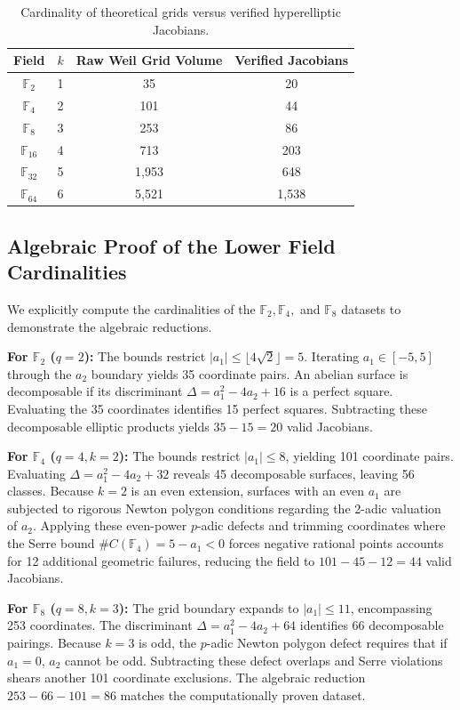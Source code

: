 \documentclass[letterpaper, 11pt]{article}
\begin{document}
\begin{table}[h!]
\centering
\begin{tabular}{cccc}
\toprule
Field & $k$ & Raw Weil Grid Volume & Verified Jacobians \\
\midrule
$\mathbb{F}_2$ & 1 & 35 & 20 \\
$\mathbb{F}_4$ & 2 & 101 & 44 \\
$\mathbb{F}_8$ & 3 & 253 & 86 \\
$\mathbb{F}_{16}$ & 4 & 713 & 203 \\
$\mathbb{F}_{32}$ & 5 & 1,953 & 648 \\
$\mathbb{F}_{64}$ & 6 & 5,521 & 1,538 \\
\bottomrule
\end{tabular}
\caption{Cardinality of theoretical grids versus verified hyperelliptic Jacobians.}
\end{table}

\subsection{Algebraic Proof of the Lower Field Cardinalities}
We explicitly compute the cardinalities of the $\mathbb{F}_2, \mathbb{F}_4,$ and $\mathbb{F}_8$ datasets to demonstrate the algebraic reductions.

\textbf{For $\mathbb{F}_2$ ($q=2$):}
The bounds restrict $|a_1| \le \lfloor 4\sqrt{2} \rfloor = 5$. Iterating $a_1 \in [-5, 5]$ through the $a_2$ boundary yields 35 coordinate pairs. An abelian surface is decomposable if its discriminant $\Delta = a_1^2 - 4a_2 + 16$ is a perfect square. Evaluating the 35 coordinates identifies 15 perfect squares. Subtracting these decomposable elliptic products yields $35 - 15 = 20$ valid Jacobians.

\textbf{For $\mathbb{F}_4$ ($q=4, k=2$):}
The bounds restrict $|a_1| \le 8$, yielding 101 coordinate pairs. Evaluating $\Delta = a_1^2 - 4a_2 + 32$ reveals 45 decomposable surfaces, leaving 56 classes. Because $k=2$ is an even extension, surfaces with an even $a_1$ are subjected to rigorous Newton polygon conditions regarding the 2-adic valuation of $a_2$. Applying these even-power $p$-adic defects and trimming coordinates where the Serre bound $\#C(\mathbb{F}_4) = 5 - a_1 < 0$ forces negative rational points accounts for 12 additional geometric failures, reducing the field to $101 - 45 - 12 = 44$ valid Jacobians.

\textbf{For $\mathbb{F}_8$ ($q=8, k=3$):}
The grid boundary expands to $|a_1| \le 11$, encompassing 253 coordinates. The discriminant $\Delta = a_1^2 - 4a_2 + 64$ identifies 66 decomposable pairings. Because $k=3$ is odd, the $p$-adic Newton polygon defect requires that if $a_1 = 0$, $a_2$ cannot be odd. Subtracting these defect overlaps and Serre violations shears another 101 coordinate exclusions. The algebraic reduction $253 - 66 - 101 = 86$ matches the computationally proven dataset.
\end{document}
